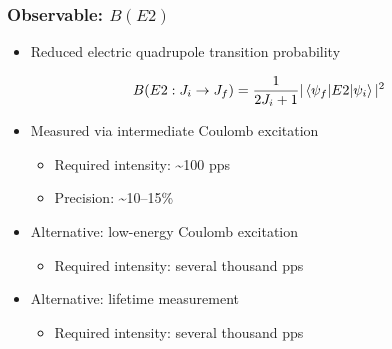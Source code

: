 \documentclass[accentcolor=tud2c,usenames,dvipsnames,colorbacktitle,inverttitle,landscape,german,presentation,t]{tudbeamer}
\begin{document}
  \begin{frame}
    \frametitle{Observable: $B(E2)$}
    \begin{itemize}
      \item Reduced electric quadrupole transition probability
    \end{itemize}
    \begin{center}
      \begin{equation*}
        B(E2:J_i\rightarrow J_f)=\frac{1}{2J_i + 1} | \braket{\psi_f | E2 | \psi_i} |^2
      \end{equation*}
    \end{center}
    \begin{itemize}
      \item Measured via intermediate Coulomb excitation
      \begin{itemize}
        \item Required intensity: \textasciitilde100 pps
        \item Precision: \textasciitilde10--15\%
      \end{itemize}
      \item Alternative: low-energy Coulomb excitation
       \begin{itemize}
        \item Required intensity: several thousand pps
      \end{itemize}
      \item Alternative: lifetime measurement
      \begin{itemize}
        \item Required intensity: several thousand pps
      \end{itemize}
    \end{itemize}
  \end{frame}
\end{document}
